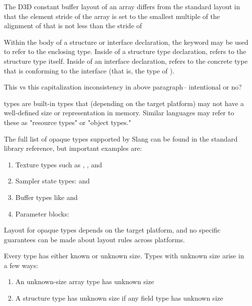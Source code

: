 
The D3D constant buffer layout of an array differs from the standard layout in that the element stride of the array is set to the smallest multiple of the alignment of  that is not less than the stride of 


Within the body of a structure or interface declaration, the keyword  may be used to refer to the enclosing type.
Inside of a structure type declaration,  refers to the structure type itself.
Inside of an interface declaration,  refers to the concrete type that is conforming to the interface (that is, the type of ).
\begin{TODO}
This vs this capitalization inconsistency in above paragraph-- intentional or no?
\end{TODO}


 types are built-in types that (depending on the target platform) may not have a well-defined size or representation in memory.
Similar languages may refer to these as "resource types" or "object types."

The full list of opaque types supported by Slang can be found in the standard library reference, but important examples are:

\begin{enumerate}
  \item{Texture types such as , , and }
  \item{Sampler state types:  and }
  \item{Buffer types like  and  }
  \item{Parameter blocks: }
\end{enumerate}

Layout for opaque types depends on the target platform, and no specific guarantees can be made about layout rules across platforms.


Every type has either known or unknown size.
Types with unknown size arise in a few ways:

\begin{enumerate}
  \item{An unknown-size array type has unknown size}
  \item{A structure type has unknown size if any field type has unknown size}
\end{enumerate}

